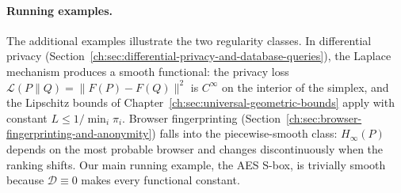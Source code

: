 \paragraph{Running examples.}
The additional examples illustrate the two regularity classes.  In differential privacy (Section~\ref{ch:sec:differential-privacy-and-database-queries}), the Laplace mechanism produces a smooth functional: the privacy loss $\mathcal L(P\|Q)=\|F(P)-F(Q)\|^2$ is $C^\infty$ on the interior of the simplex, and the Lipschitz bounds of Chapter~\ref{ch:sec:universal-geometric-bounds} apply with constant $L\le 1/\min_i\pi_i$.  Browser fingerprinting (Section~\ref{ch:sec:browser-fingerprinting-and-anonymity}) falls into the piecewise-smooth class: $H_\infty(P)$ depends on the most probable browser and changes discontinuously when the ranking shifts.  Our main running example, the AES S-box, is trivially smooth because $\mathcal D\equiv0$ makes every functional constant.

